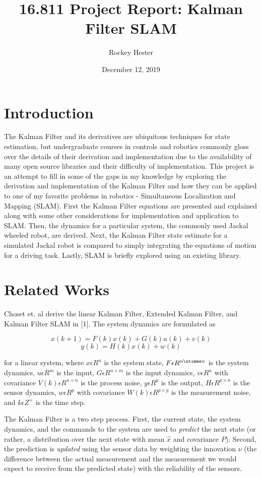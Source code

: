 \documentclass{article}
\title{16.811 Project Report: Kalman Filter SLAM}
\author{Rockey Hester}
\date{December 12, 2019}
\begin{document}
\maketitle

\section{Introduction}

The Kalman Filter and its derivatives are ubiquitous techniques for state estimation, but undergraduate courses in controls and robotics commonly gloss over the details of their derivation and implementation due to the availability of many open source libraries and their difficulty of implementation. This project is an attempt to fill in some of the gaps in my knowledge by exploring the derivation and implementation of the Kalman Filter and how they can be applied to one of my favorite problems in robotics - Simultaneous Localization and Mapping (SLAM). First the Kalman Filter equations are presented and explained along with some other considerations for implementation and application to SLAM. Then, the dynamics for a particular system, the commonly used Jackal wheeled robot, are derived. Next, the Kalman Filter state estimate for a simulated Jackal robot is compared to simply integrating the equations of motion for a driving task. Lastly, SLAM is briefly explored using an existing library.

\section{Related Works}

Choset et. al derive the linear Kalman Filter, Extended Kalman Filter, and Kalman Filter SLAM in [1]. The system dynamics are formulated as

$$x(k+1) = F(k) x(k) + G(k) u(k) + v(k)$$
$$y(k) = H(k) x(k) + w(k)$$

for a linear system, where $x \epsilon R^n$ is the system state, $F \epsilon R^{n \xtimes n}$ is the system dynamics, $u \epsilon R^m$ is the input, $G \epsilon R^{n \times m}$ is the input dynamics, $v \epsilon R^n$ with covariance $V(k) \epsilon R^{n \times n}$ is the process noise, $y \epsilon R^p$ is the output, $H \epsilon R^{p \times n}$ is the sensor dynamics, $w \epsilon R^p$ with covariance $W(k) \epsilon R^{p \times p}$ is the measurement noise, and $k \epsilon Z^+$ is the time step.

The Kalman Filter is a two step process. First, the current state, the system dynamics, and the commands to the system are used to \textit{predict} the next state (or rather, a distribution over the next state with mean $\hat{x}$ and covariance $P$). Second, the prediction is \textit{updated} using the sensor data by weighting the innovation $\nu$ (the difference between the actual measurement and the measurement we would expect to receive from the predicted state) with the reliability of the sensors.
\end{document}
